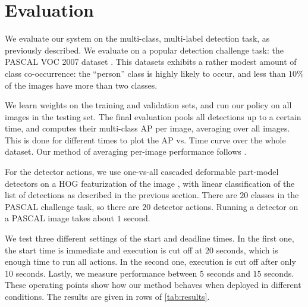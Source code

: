 \section{Evaluation} \label{sec:evaluation}

We evaluate our system on the multi-class, multi-label detection task, as previously described.
We evaluate on a popular detection challenge task: the PASCAL VOC 2007 dataset \cite{pascal-voc-2010}.
This datasets exhibits a rather modest amount of class co-occurrence: the ``person'' class is highly likely to occur, and less than $10\%$ of the images have more than two classes.

We learn weights on the training and validation sets, and run our policy on all images in the testing set.
The final evaluation pools all detections up to a certain time, and computes their multi-class AP per image, averaging over all images.
This is done for different times to plot the AP vs. Time curve over the whole dataset.
Our method of averaging per-image performance follows \cite{Desai2009}.

For the detector actions, we use one-vs-all cascaded deformable part-model detectors on a HOG featurization of the image \cite{Felzenszwalb2010b}, with linear classification of the list of detections as described in the previous section.
There are $20$ classes in the PASCAL challenge task, so there are $20$ detector actions.
Running a detector on a PASCAL image takes about $1$ second.

We test three different settings of the start and deadline times.
In the first one, the start time is immediate and execution is cut off at $20$ seconds, which is enough time to run all actions.
In the second one, execution is cut off after only $10$ seconds.
Lastly, we measure performance between $5$ seconds and $15$ seconds.
These operating points show how our method behaves when deployed in different conditions.
The results are given in rows of \autoref{tab:results}.

